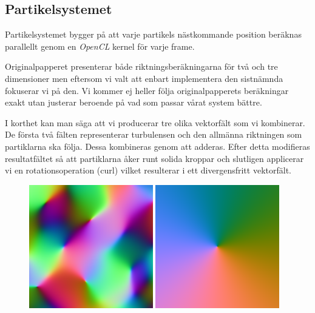 \documentclass[a4paper]{article}
\begin{document}
\begin{multicols}{2}
    \vspace{-0.35cm}
    \subsection{Partikelsystemet} \label{sec:partikelsystemet}

    Partikelsystemet bygger på att varje partikels nästkommande position beräknas parallellt genom en \textit{OpenCL} kernel för varje frame. 

    Originalpapperet presenterar både riktningsberäkningarna för två och tre dimensioner men eftersom vi valt att enbart implementera den sistnämnda fokuserar vi på den. Vi kommer ej heller följa originalpapperets beräkningar exakt utan justerar beroende på vad som passar vårat system bättre.

    I korthet kan man säga att vi producerar tre olika vektorfält som vi kombinerar. De första två fälten representerar turbulensen och den allmänna riktningen som partiklarna ska följa. Dessa kombineras genom att adderas. Efter detta modifieras resultatfältet så att partiklarna åker runt solida kroppar och slutligen applicerar vi en rotationsoperation (curl) vilket resulterar i ett divergensfritt vektorfält.

\begin{figure}[H]
\begin{minipage}[]{0.5\textwidth}
\center
\includegraphics[width=0.48\textwidth]{share/Noise_downscale.png}
\includegraphics[width=0.48\textwidth]{share/Background_downscale.png}


\end{minipage}
\end{figure}
\end{multicols}
\end{document}
